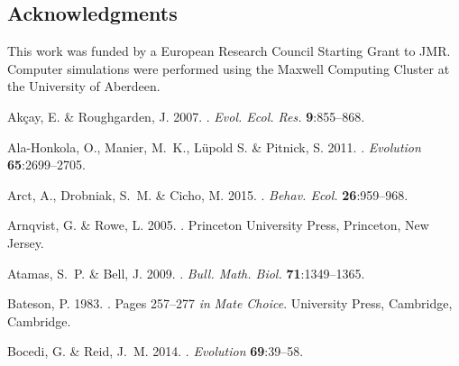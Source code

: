 \documentclass[10pt,letterpaper]{article}
\begin{document}
\subsection*{Acknowledgments}

This work was funded by a European Research Council Starting Grant to JMR. Computer simulations were performed using the Maxwell Computing Cluster at the University of Aberdeen.


\begin{thebibliography}{73}
\providecommand{\natexlab}[1]{#1}

Ak{\c{c}}ay, E. \& Roughgarden, J. 2007.
.
\newblock \textit{Evol. Ecol. Res.} \textbf{9}:855--868.

Ala-Honkola, O., Manier, M.~K., L{\"{u}}pold S. \& Pitnick, S. 2011.
.
\newblock \textit{Evolution} \textbf{65}:2699--2705.

Arct, A., Drobniak, S.~M. \& Cicho, M. 2015.
.
\newblock \textit{Behav. Ecol.} \textbf{26}:959--968.

Arnqvist, G. \& Rowe, L. 2005.
.
\newblock Princeton University Press, Princeton, New Jersey.

Atamas, S.~P. \& Bell, J. 2009.
.
\newblock \textit{Bull. Math. Biol.} \textbf{71}:1349--1365.

Bateson, P. 1983.
.
\newblock Pages 257--277 \emph{in} \textit{Mate Choice}. University Press, Cambridge,
  Cambridge.

Bocedi, G. \& Reid, J.~M. 2014.
.
\newblock \textit{Evolution} \textbf{69}:39--58.


\end{thebibliography}
\end{document}
